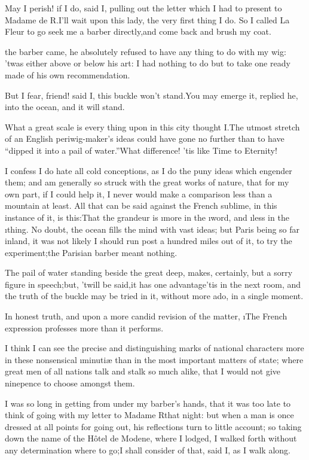 \documentclass[twoside]{article}
\begin{document}
\tsk May I perish! if I do, said I, pulling out the letter which I had to
present to Madame de R\tsk .\tsk I’ll wait upon this lady, the very first thing I
do.  So I called La Fleur to go seek me a barber directly,\tsk and come back
and brush my coat.






 the barber came, he absolutely refused to have any thing to do with
my wig: ’twas either above or below his art: I had nothing to do but to
take one ready made of his own recommendation.

\tsk But I fear, friend! said I, this buckle won’t stand.\tsk You may emerge it,
replied he, into the ocean, and it will stand.\tsk 

What a great scale is every thing upon in this city thought I.\tsk The utmost
stretch of an English periwig-maker’s ideas could have gone no further
than to have “dipped it into a pail of water.”\tsk What difference! ’tis like
Time to Eternity!

I confess I do hate all cold conceptions, as I do the puny ideas which
engender them; and am generally so struck with the great works of nature,
that for my own part, if I could help it, I never would make a comparison
less than a mountain at least.  All that can be said against the French
sublime, in this instance of it, is this:\tsk That the grandeur is \i{more} in
the \i{word}, and \i{less} in the \i{thing}.  No doubt, the ocean fills the
mind with vast ideas; but Paris being so far inland, it was not likely I
should run post a hundred miles out of it, to try the experiment;\tsk the
Parisian barber meant nothing.\tsk 

The pail of water standing beside the great deep, makes, certainly, but a
sorry figure in speech;\tsk but, ’twill be said,\tsk it has one advantage\tsk ’tis in
the next room, and the truth of the buckle may be tried in it, without
more ado, in a single moment.

In honest truth, and upon a more candid revision of the matter, \i{The
French expression professes more than it performs}.

I think I can see the precise and distinguishing marks of national
characters more in these nonsensical \i{minutiæ} than in the most important
matters of state; where great men of all nations talk and stalk so much
alike, that I would not give ninepence to choose amongst them.

I was so long in getting from under my barber’s hands, that it was too
late to think of going with my letter to Madame R\tsk  that night: but when a
man is once dressed at all points for going out, his reflections turn to
little account; so taking down the name of the Hôtel de Modene, where I
lodged, I walked forth without any determination where to go;\tsk I shall
consider of that, said I, as I walk along.
\end{document}
